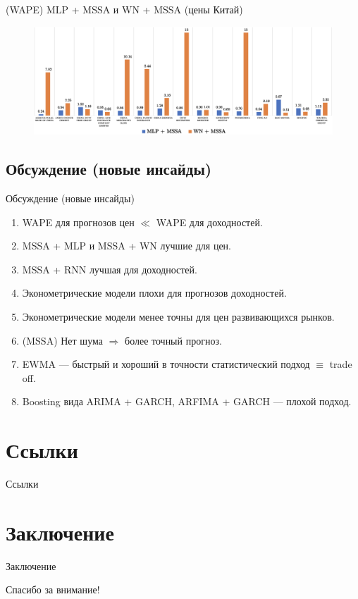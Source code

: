\documentclass[11pt, aspectratio= 169]{beamer}
\begin{document}
	\begin{frame}{(WAPE) MLP + MSSA и WN + MSSA (цены Китай)}
		\begin{figure}[H]
			\includegraphics[width= 15cm]{./mlp_wn/ch.png}
		\end{figure}
	\end{frame}
	
	\subsection{Обсуждение (новые инсайды)}
	\begin{frame}{Обсуждение (новые инсайды)}
		\begin{enumerate}
			\item WAPE  для прогнозов цен $\ll$ WAPE для доходностей.
			\item MSSA + MLP и MSSA + WN лучшие для цен.
			\item MSSA + RNN лучшая для доходностей.
			\item Эконометрические модели плохи для прогнозов доходностей.
			\item Эконометрические модели менее точны для цен развивающихся рынков.
			\item (MSSA) Нет шума $\Rightarrow$ более точный прогноз.
			\item EWMA --- быстрый и хороший в точности статистический подход $\equiv$ trade off.
			\item Boosting вида ARIMA + GARCH, ARFIMA + GARCH --- плохой подход.
		\end{enumerate}
	\end{frame}
	
	\section{Ссылки}
	\begin{frame}[allowframebreaks]{Ссылки}
		
		
	\end{frame}
	
	\section{Заключение}
	\begin{frame}{Заключение}
		\begin{center}
			\LARGE
			Спасибо за внимание!
		\end{center}
	\end{frame}
\end{document}
